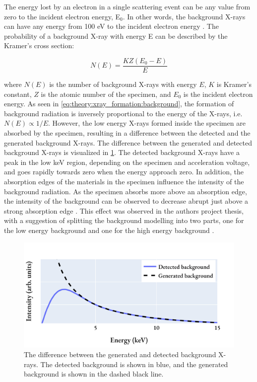 The energy lost by an electron in a single scattering event can be any value from zero to the incident electron energy, E$_0$.
In other words, the background X-rays can have any energy from 100 eV to the incident electron energy \cite[Ch. 4.3]{goldstein_scanning_2018}.
The probability of a background X-ray with energy E can be described by the Kramer's cross section:

\begin{equation}
    \label{eq:theory:xray_formation:background}
    N(E) = \frac{K Z (E_0-E)}{E}
\end{equation}

where $N(E)$ is the number of background X-rays with energy $E$, $K$ is Kramer's constant, $Z$ is the atomic number of the specimen, and $E_0$ is the incident electron energy.
As seen in \cref{eq:theory:xray_formation:background}, the formation of background radiation is inversely proportional to the energy of the X-rays, i.e. $N(E) \propto 1/E$.
However, the low energy X-rays formed inside the specimen are absorbed by the specimen, resulting in a difference between the detected and the generated background X-rays.
The difference between the generated and detected background X-rays is visualized in \cref{fig:background_xrays}.
The detected background X-rays have a peak in the low keV region, depending on the specimen and acceleration voltage, and goes rapidly towards zero when the energy approach zero.
In addition, the absorption edges of the materials in the specimen influence the intensity of the background radiation.
As the specimen absorbs more above an absorption edge, the intensity of the background can be observed to decrease abrupt just above a strong absorption edge \cite[p. 59]{goldstein_scanning_2018}.
This effect was observed in the authors project thesis, with a suggestion of splitting the background modelling into two parts, one for the low energy background and one for the high energy background \cite{project_report}.

\begin{figure}[ht]
    \centering
    \includegraphics[width=0.65\linewidth]{figures/background_generated_detected.png}
    \caption{
        The difference between the generated and detected background X-rays.
        The detected background is shown in blue, and the generated background is shown in the dashed black line.
    }
    \label{fig:background_xrays}
\end{figure}


